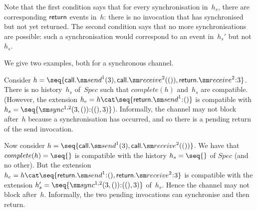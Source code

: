 Note that the first condition says that for every synchronisation in~$h_s$,
there are corresponding $\mathsf{return}$ events in~$h$: there is no invocation that
has synchronised but not yet returned.  The second condition says that no more
synchronisations are possible: such a synchronisation would correspond to an
event in~$h_s'$ but not~$h_s$.


We give two examples, both for a synchronous channel.
%
\begin{example}
Consider $h = \seq{ \call.\send^1(3), \call.\receive^2(()),
  \return.\receive^2\::3 }$.  There is no history~$h_s$ of~$Spec$ such that
$complete(h)$ and~$h_s$ are compatible.  (However, the extension $h_e = h \cat
\seq{ \return.\send^1 \:: () }$ is compatible with $h_s =
\seq{\sync^{1,2}(3,())\::((),3) }$).  Informally, the channel may not block
after~$h$ because a synchronisation has occurred, and so there is a pending
return of the send invocation.

\end{example}

\begin{example}
Now consider $h = \seq{\call.\send^1(3), \call.\receive^2(())}$.  We have that
$complete(h) = \seq{}$ is compatible with the history $h_s = \seq{}$ of $Spec$
(and no other). But the extension $h_e = h \cat
\seq{\return.\send^1\::(),\linebreak[1] \return.\receive^2\::3}$ is compatible
with the extension $h_s' = \linebreak[1] \seq{\sync^{1,2}(3,()) \:: ((),3)}$
of~$h_s$.  Hence the channel may not block after~$h$.  Informally, the two
pending invocations can synchronise and then return. 
\end{example}


  
